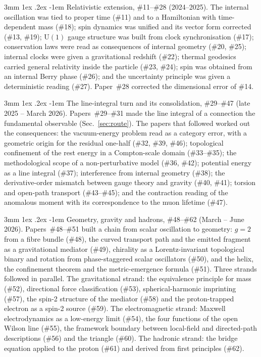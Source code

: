 \documentclass[%
 reprint, amsmath,amssymb, aps, prb, ]{revtex4-2}
\makeatletter
\numberwithin{equation}{section}
\renewcommand\paragraph{%
  \@startsection{paragraph}{4}{\z@}%
    {3mm \@plus 1ex \@minus .2ex}%
    {-1em}%
    {\normalfont\normalsize\itshape}}
\makeatother
\begin{document}
\paragraph{Relativistic extension, \#11--\#28 (2024--2025).} The internal oscillation was tied to proper time (\#11) and to a Hamiltonian with time-dependent mass (\#18); spin dynamics was unified and its vector form corrected (\#13, \#19); $\mathrm{U}(1)$ gauge structure was built from clock synchronisation (\#17); conservation laws were read as consequences of internal geometry (\#20, \#25); internal clocks were given a gravitational redshift (\#22); thermal geodesics carried general relativity inside the particle (\#23, \#24); spin was obtained from an internal Berry phase (\#26); and the uncertainty principle was given a deterministic reading (\#27). Paper~\#28 corrected the dimensional error of \#14.

\paragraph{The line-integral turn and its consolidation, \#29--\#47 (late 2025 -- March 2026).} Papers~\#29--\#31 made the line integral of a connection the fundamental observable (Sec.~\ref{sec:route}). The papers that followed worked out the consequences: the vacuum-energy problem read as a category error, with a geometric origin for the residual one-half (\#32, \#39, \#46); topological confinement of the rest energy in a Compton-scale domain (\#33--\#35); the methodological scope of a non-perturbative model (\#36, \#42); potential energy as a line integral (\#37); interference from internal geometry (\#38); the derivative-order mismatch between gauge theory and gravity (\#40, \#41); torsion and open-path transport (\#43--\#45); and the contraction reading of the anomalous moment with its correspondence to the muon lifetime (\#47).

\paragraph{Geometry, gravity and hadrons, \#48--\#62 (March -- June 2026).} Papers~\#48--\#51 built a chain from scalar oscillation to geometry: $g = 2$ from a fibre bundle (\#48), the curved transport path and the emitted fragment as a gravitational mediator (\#49), chirality as a Lorentz-invariant topological binary and rotation from phase-staggered scalar oscillators (\#50), and the helix, the confinement theorem and the metric-emergence formula (\#51). Three strands followed in parallel. The gravitational strand: the equivalence principle for mass (\#52), directional force classification (\#53), spherical-harmonic imprinting (\#57), the spin-2 structure of the mediator (\#58) and the proton-trapped electron as a spin-2 source (\#59). The electromagnetic strand: Maxwell electrodynamics as a low-energy limit (\#54), the four functions of the open Wilson line (\#55), the framework boundary between local-field and directed-path descriptions (\#56) and the triangle (\#60). The hadronic strand: the bridge equation applied to the proton (\#61) and derived from first principles (\#62).
\end{document}

